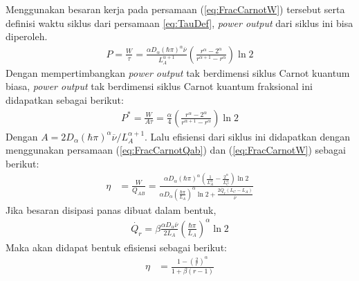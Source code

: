 Menggunakan besaran kerja pada persamaan (\ref{eq:FracCarnotW}) tersebut serta definisi waktu siklus dari persamaan \ref{eq:TauDef}, \textit{power output} dari siklus ini bisa diperoleh.
\begin{align}
    P = \frac{W}{\tau} = \frac{\alpha D_\alpha(\hbar\pi)^\alpha \overline{\nu}}{L_A^{\alpha+1}} \left(\frac{r^\alpha - 2^\alpha}{r^{\alpha+1} - r^\alpha}\right) \ln{2}
\end{align}
Dengan mempertimbangkan \textit{power output} tak berdimensi siklus Carnot kuantum biasa, \textit{power output} tak berdimensi siklus Carnot kuantum fraksional ini didapatkan sebagai berikut:
\begin{align}
    P^* = \frac{W}{A\tau} = \frac{\alpha}{4}\left(\frac{r^\alpha - 2^\alpha}{r^{\alpha+1} - r^\alpha}\right) \ln{2}
\end{align}
Dengan \(A=2D_\alpha(\hbar\pi)^\alpha\overline{\nu}/L_A^{\alpha+1}\). Lalu efisiensi dari siklus ini didapatkan dengan menggunakan persamaan (\ref{eq:FracCarnotQab}) dan (\ref{eq:FracCarnotW}) sebagai berikut:
\begin{align}
    \eta &= \frac{W}{Q_{AB}} = \frac{\alpha D_\alpha(\hbar\pi)^\alpha \left(\frac{1}{L_A^\alpha} - \frac{2^\alpha}{L_C^\alpha}\right) \ln{2}}{\alpha D_\alpha\left(\frac{\hbar\pi}{L_A}\right)^\alpha \ln{2} + \frac{2\dot{Q_r}(L_C - L_A)}{\overline{\nu}}} 
\end{align}
Jika besaran disipasi panas dibuat dalam bentuk,
\begin{align}
    \dot{Q_r} = \beta \frac{\alpha D_\alpha\overline{\nu}}{2L_A}\left(\frac{\hbar\pi}{L_A}\right)^\alpha \ln{2}
\end{align}
Maka akan didapat bentuk efisiensi sebagai berikut:
\begin{align}
    \eta &= \frac{1 - \left(\frac{2}{r}\right)^\alpha}{1+\beta(r-1)}
\end{align}
